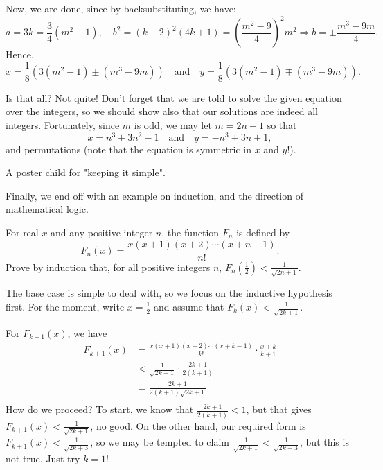 \documentclass[../main.tex]{subfiles}
\begin{document}
Now, we are done, since by backsubstituting, we have:
$$a=3k=\frac{3}{4}(m^2-1), \quad b^2=(k-2)^2(4k+1)=\left(\frac{m^2-9}{4}\right)^2m^2 \Longrightarrow b=\pm \frac{m^3-9m}{4}.$$
Hence,
$$x=\frac{1}{8}\left(3(m^2-1)\pm(m^3-9m)\right)\quad\text{and}\quad y=\frac{1}{8}\left(3(m^2-1)\mp(m^3-9m)\right).$$

Is that all? Not quite! Don't forget that we are told to solve the given equation over the integers, so we should show also that our solutions are indeed all integers. Fortunately, since $m$ is odd, we may let $m=2n+1$ so that
$$\boxed{x=n^3+3n^2-1\quad\text{and}\quad y=-n^3+3n+1},$$
and permutations (note that the equation is symmetric in $x$ and $y$!).
\begin{moral}
A poster child for "keeping it simple".
\end{moral}

Finally, we end off with an example on induction, and the direction of mathematical logic.
\begin{example}
For real $x$ and any positive integer $n$, the function $F_n$ is defined by
$$F_n(x)=\frac{x(x+1)(x+2)\cdots(x+n-1)}{n!}.$$
Prove by induction that, for all positive integers $n$, $F_n\left(\frac{1}{2}\right) < \frac{1}{\sqrt{2n+1}}$.
\end{example}
The base case is simple to deal with, so we focus on the inductive hypothesis first. For the moment, write $x=\frac{1}{2}$ and assume that $F_k(x)<\frac{1}{\sqrt{2k+1}}$.

For $F_{k+1}(x)$, we have
\begin{align*}
    F_{k+1}(x)&=\frac{x(x+1)(x+2)\cdots(x+k-1)}{k!} \cdot \frac{x+k}{k+1} \\
    &< \frac{1}{\sqrt{2k+1}} \cdot \frac{2k+1}{2(k+1)} \\
    &= \frac{2k+1}{2(k+1)\sqrt{2k+1}} \\
\end{align*}
How do we proceed? To start, we know that $\frac{2k+1}{2(k+1)} < 1$, but that gives $F_{k+1}(x) < \frac{1}{\sqrt{2k+1}}$, no good. On the other hand, our required form is $F_{k+1}(x) < \frac{1}{\sqrt{2k+3}}$, so we may be tempted to claim $\frac{1}{\sqrt{2k+1}} < \frac{1}{\sqrt{2k+3}}$, but this is not true. Just try $k=1$!
\end{document}
